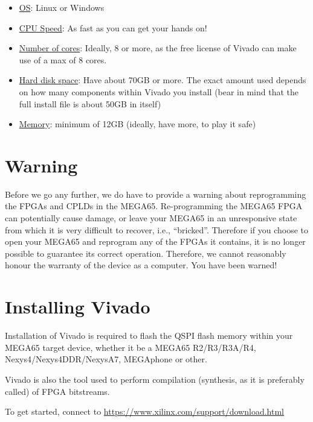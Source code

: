 \begin{itemize}
  \item \underline{OS}: Linux or Windows
  \item \underline{CPU Speed}: As fast as you can get your hands on!
  \item \underline{Number of cores}: Ideally, 8 or more, as the free license of Vivado can make use of a max of 8 cores.
  \item \underline{Hard disk space}: Have about 70GB or more. The exact amount used depends on how many components within Vivado you install (bear in mind that the full install file is about 50GB in itself)
  \item \underline{Memory}: minimum of 12GB (ideally, have more, to play it safe)
\end{itemize}

\section{Warning}

Before we go any further, we do have to provide a warning about reprogramming the FPGAs and
CPLDs in the MEGA65.
Re-programming the MEGA65 FPGA can potentially cause
damage, or leave your MEGA65 in an unresponsive state from which it is very difficult to
recover, i.e., ``bricked''.  Therefore if you choose to open your MEGA65 and reprogram
any of the FPGAs it contains, it is no longer possible to guarantee its correct operation.
Therefore, we cannot reasonably honour the warranty of the
device as a computer.
You have been warned!

\section{Installing Vivado}
\label{sec:installvivado}

Installation of Vivado is required to flash the QSPI flash memory within your MEGA65 target device, whether it be a MEGA65 R2/R3/R3A/R4, Nexys4/Nexys4DDR/NexysA7, MEGAphone or other.

Vivado is also the tool used to perform compilation (synthesis, as it is preferably called) of FPGA bitstreams.

To get started, connect to \url{https://www.xilinx.com/support/download.html}

